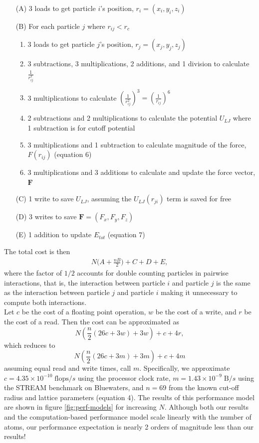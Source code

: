 \documentclass[12pt]{article}
\begin{document}
\begin{itemize}
\item[(A)] 3 loads to get particle $i$'s position, $r_i = (x_i, y_i, z_i)$
\item[(B)] For each particle $j$ where $r_{ij}<r_c$
  \begin{enumerate}
    \item 3 loads to get particle $j$'s position, $r_j = (x_j, y_j, z_j)$
    \item 3 subtractions, 3 multiplications, 2 additions, and 1 division to calculate $\frac{1}{r_{ij}^2}$ 
    \item 3 multiplications to calculate $\left(\frac{1}{r_{ij}^2}\right)^3 = \left(\frac{1}{r_{ij}}\right)^6$
    \item 2 subtractions and 2 multiplications to calculate the potential $U_{LJ}$  
             where 1 subtraction is for cutoff potential
    \item 3 multiplications and 1 subtraction to calculate magnitude of the force, $F(r_{ij})$ (equation 6)
    \item 3 multiplications and 3 additions to calculate and update the force vector, $\textbf{F}$
  \end{enumerate}
\item[(C)] 1 write to save $U_{LJ}$, assuming the $U_{LJ}(r_{ji})$ term is saved for free
\item[(D)] 3 writes to save $\textbf{F} = (F_x, F_y, F_z)$
\item[(E)] 1 addition to update $E_{tot}$ (equation 7)
\end{itemize}
The total cost is then
\begin{align}
    N\bigg(A+\frac{nB}{2}\bigg)+C+D+E,
\end{align}
where the factor of $1/2$ accounts for double counting particles in pairwise interactions, 
that is, the interaction between particle $i$ and particle $j$ is the same as the interaction 
between particle $j$ and particle $i$ making it unnecessary to compute both interactions. \\

 Let $c$ be the cost of a floating point operation, $w$ be the cost of a write, 
and $r$ be the cost of a read. Then the cost can be approximated as
\begin{equation}
    N \left(\frac{n}{2} \left(26 c + 3 w\right) + 3 w\right) + c + 4 r,
\end{equation}
which reduces to
\begin{equation}
  N \left(\frac{n}{2} \left(26 c + 3 m\right) + 3 m\right) + c + 4 m
  \label{eqn:perf-model}
\end{equation}
assuming equal read and write times, call $m$. Specifically, we
approximate $c = 4.35\times10^{-10}\;\text{flops}/s$ using the
processor clock rate, $m = 1.43\times10^{-9}\;\text{B}/s$ using the
STREAM benchmark on Bluewaters, and $n = 69$ from the known cut-off
radius and lattice parameters (equation 4).  The results of this
performance model are shown in figure \ref{fig:perf-models} for
increasing $N$. Although both our results and the computation-based
performance model scale linearly with the number of atoms, our
performance expectation is nearly 2 orders of magnitude less than our
results!
\end{document}
